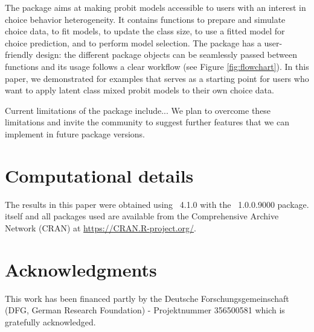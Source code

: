 \documentclass[article]{jss}
\begin{document}
The  package aims at making probit models accessible to  users with an interest in choice behavior heterogeneity. It contains functions to prepare and simulate choice data, to fit models, to update the class size, to use a fitted model for choice prediction, and to perform model selection. The  package has a user-friendly design: the different package objects can be seamlessly passed between functions and its usage follows a clear workflow (see Figure \ref{fig:flowchart}). In this paper, we demonstrated for examples that serves as a starting point for  users who want to apply latent class mixed probit models to their own choice data.

Current limitations of the  package include... We plan to overcome these limitations and invite the community to suggest further features that we can implement in future package versions.

\section*{Computational details}

The results in this paper were obtained using
~4.1.0 with the
~1.0.0.9000 package.  itself
and all packages used are available from the Comprehensive
 Archive Network (CRAN) at \url{https://CRAN.R-project.org/}.


\section*{Acknowledgments}

This work has been financed partly by the Deutsche Forschungsgemeinschaft (DFG, German Research Foundation) - Projektnummer 356500581 which is gratefully acknowledged.


\end{document}
